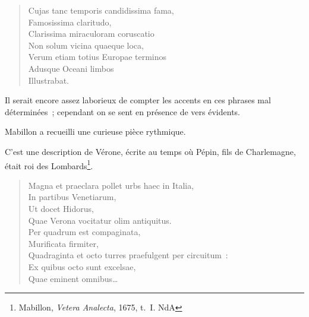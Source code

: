\documentclass[french,twoside]{book} %
\begin{document}
\begin{verse}
Cujas tanc temporis candidissima fama,\\
Famosissima claritudo,\\
Clarissima miraculoram coruscatio\\
Non solum vicina quaeque loca,\\
Verum etiam totius Europae terminos\\
Adusque Oceani limbos\\
Illustrabat.\\
\end{verse}

\noindent Il serait encore assez laborieux de compter les accents en ces phrases mal déterminées ; cependant on se sent en présence de vers évidents.\par
Mabillon a recueilli une curieuse pièce rythmique.\par
C’est une description de Vérone, écrite au temps où Pépin, fils de Charlemagne, était roi des Lombards\footnote{Mabillon, {\itshape Vetera Analecta}, 1675, t. I. NdA}.\par


\begin{verse}
Magna et praeclara pollet urbs haec in Italia,\\
In partibus Venetiarum,\\
Ut docet Hidorus,\\
Quae Verona vocitatur olim antiquitus.\\
Per quadrum est compaginata,\\
Murificata firmiter,\\
Quadraginta et octo turres praefulgent per circuitum :\\
Ex quibus octo sunt excelsae,\\
Quae eminent omnibus…\\
\end{verse}
\end{document}
